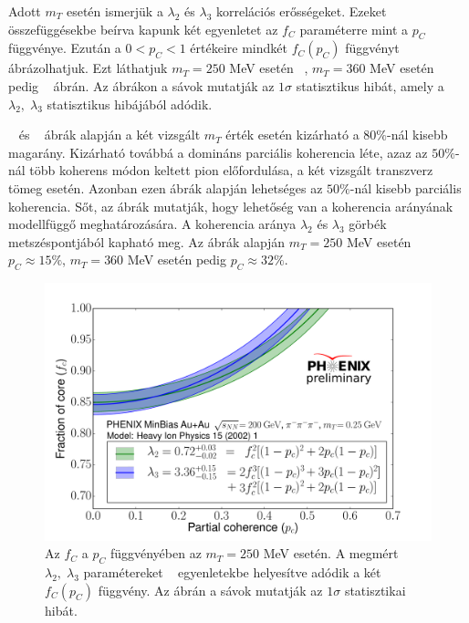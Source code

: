\documentclass[11pt,a4paper]{article}
\numberwithin{equation}{subsection}
\numberwithin{figure}{section}
\begin{document}
Adott $m_T$ esetén ismerjük a $\lambda_2$ és $\lambda_3$ korrelációs erősségeket. Ezeket ~ összefüggésekbe beírva kapunk két egyenletet az $f_C$ paraméterre mint a $p_C$ függvénye. Ezután a $0<p_C<1$ értékeire mindkét $f_C(p_C)$ függvényt ábrázolhatjuk. Ezt láthatjuk $m_T=250$ MeV esetén ~, $m_T=360$ MeV esetén pedig ~ ábrán. Az ábrákon a sávok mutatják az $1\sigma$ statisztikus hibát, amely a $\lambda_2,\;\lambda_3$ statisztikus hibájából adódik.

~ és ~ ábrák alapján a két vizsgált $m_T$ érték esetén kizárható a $80\%$-nál kisebb magarány. Kizárható továbbá a domináns parciális koherencia léte, azaz az $50\%$-nál több koherens módon keltett pion előfordulása, a két vizsgált transzverz tömeg esetén. Azonban ezen ábrák alapján lehetséges az $50\%$-nál kisebb parciális koherencia. Sőt, az ábrák mutatják, hogy lehetőség van a koherencia arányának modellfüggő meghatározására. A koherencia aránya $\lambda_2$ és $\lambda_3$ görbék metszéspontjából kapható meg. Az ábrák alapján $m_T=250$ MeV esetén $p_C\approx 15\%$, $m_T=360$ MeV esetén pedig $p_C\approx 32\%$.


\begin{figure}[H]
\centering
\includegraphics[scale=0.1]{pic/res/fcpc1_.pdf}
\caption{Az $f_C$ a $p_C$ függvényében az $m_T=250$ MeV esetén. A megmért $\lambda_2,\;\lambda_3$ paramétereket ~ egyenletekbe helyesítve adódik a két $f_C(p_C)$ függvény. Az ábrán a sávok mutatják az $1\sigma$ statisztikai hibát.}
\label{fig:fcpc1}
\end{figure}
\end{document}
